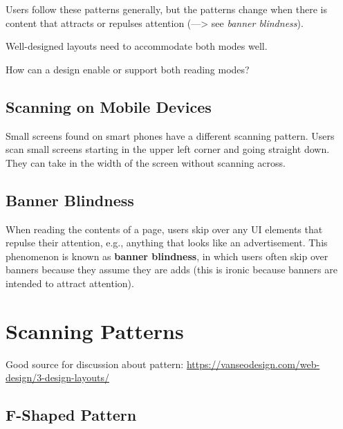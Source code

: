 Users follow these patterns generally, but the patterns change when there is content that attracts or repulses attention (---> see \emph{banner blindness}).

Well-designed layouts need to accommodate both modes well. 

\begin{tcolorbox}[
	width=\textwidth,
	title={\textbf{Question}},
	outer arc=0mm,
	arc=0mm,
	boxrule=1pt,
	]    
How can a design enable or support both reading modes?
\end{tcolorbox} 


\subsection{Scanning on Mobile Devices} %
\label{ssub:scanning_on_mobile_devices}

Small screens found on smart phones have a different scanning pattern. Users scan small screens starting in the upper left corner and going straight down. They can take in the width of the screen without scanning across.

\subsection{Banner Blindness} %
\label{sub:banner_blindness}

When reading the contents of a page, users skip over any UI elements that repulse their attention, e.g., anything that looks like an advertisement. This phenomenon is known as \textbf{banner blindness}, in which users often skip over banners because they assume they are adds (this is ironic because banners are intended to attract attention).







\section{Scanning Patterns} %
\label{sec:scanning_patterns}
Good source for discussion about pattern: \url{https://vanseodesign.com/web-design/3-design-layouts/}

\subsection{F-Shaped Pattern} %
\label{sub:f_shaped_pattern}

